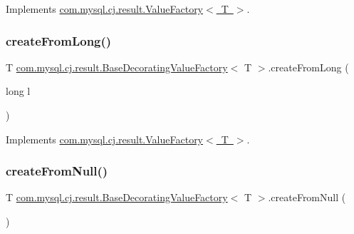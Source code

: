 Implements \mbox{\hyperlink{interfacecom_1_1mysql_1_1cj_1_1result_1_1_value_factory_a9977e0c9d2bb9e306ee4a5a2ead6840c}{com.\+mysql.\+cj.\+result.\+Value\+Factory$<$ T $>$}}.

\mbox{\label{classcom_1_1mysql_1_1cj_1_1result_1_1_base_decorating_value_factory_afac99d3f28348caf19dbd661c609fb9f}} 
\subsubsection{\texorpdfstring{create\+From\+Long()}{createFromLong()}}
{\footnotesize\ttfamily T \mbox{\hyperlink{classcom_1_1mysql_1_1cj_1_1result_1_1_base_decorating_value_factory}{com.\+mysql.\+cj.\+result.\+Base\+Decorating\+Value\+Factory}}$<$ T $>$.create\+From\+Long (\begin{DoxyParamCaption}\item[{long}]{l }\end{DoxyParamCaption})}



Implements \mbox{\hyperlink{interfacecom_1_1mysql_1_1cj_1_1result_1_1_value_factory_a48c32868f2e3efac502522211a40f642}{com.\+mysql.\+cj.\+result.\+Value\+Factory$<$ T $>$}}.

\mbox{\label{classcom_1_1mysql_1_1cj_1_1result_1_1_base_decorating_value_factory_aa7c19e3967273a1c5b806c858165200a}} 
\subsubsection{\texorpdfstring{create\+From\+Null()}{createFromNull()}}
{\footnotesize\ttfamily T \mbox{\hyperlink{classcom_1_1mysql_1_1cj_1_1result_1_1_base_decorating_value_factory}{com.\+mysql.\+cj.\+result.\+Base\+Decorating\+Value\+Factory}}$<$ T $>$.create\+From\+Null (\begin{DoxyParamCaption}{ }\end{DoxyParamCaption})}




